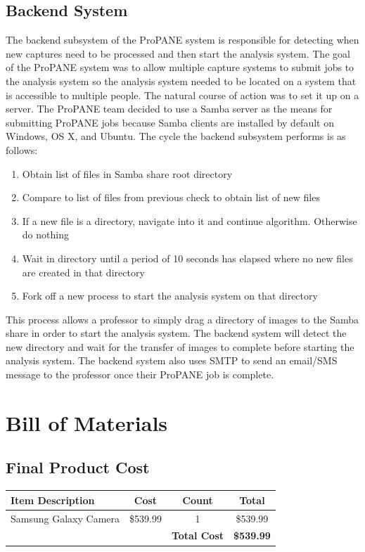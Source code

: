 \documentclass[]{article}
\begin{document}
		\subsection{Backend System}
			The backend subsystem of the ProPANE system is responsible for detecting when new captures need to be processed and then start the analysis system. The goal of the ProPANE system was to allow multiple capture systems to submit jobs to the analysis system so the analysis system needed to be located on a system that is accessible to multiple people. The natural course of action was to set it up on a server. The ProPANE team decided to use a Samba server as the means for submitting ProPANE jobs because Samba clients are installed by default on Windows, OS X, and Ubuntu. The cycle the backend subsystem performs is as follows:
			\begin{enumerate}
				\item Obtain list of files in Samba share root directory
				\item Compare to list of files from previous check to obtain list of new files
				\item If a new file is a directory, navigate into it and continue algorithm. Otherwise do nothing
				\item Wait in directory until a period of 10 seconds has elapsed where no new files are created in that directory
				\item Fork off a new process to start the analysis system on that directory
			\end{enumerate}
			This process allows a professor to simply drag a directory of images to the Samba share in order to start the analysis system. The backend system will detect the new directory and wait for the transfer of images to complete before starting the analysis system. The backend system also uses SMTP to send an email/SMS message to the professor once their ProPANE job is complete. 

	\section{Bill of Materials}
	
		\subsection{Final Product Cost}
		
			\begin{tabular}{ | l | c | c | c |}
				\hline
				Item Description & Cost & Count & Total \\
				\hline
				Samsung Galaxy Camera & \$539.99 & 1 & \$539.99 \\
				\hline
				& & \textbf{Total Cost} & \textbf{\$539.99}\\
				\hline
			\end{tabular}
	
\end{document}
